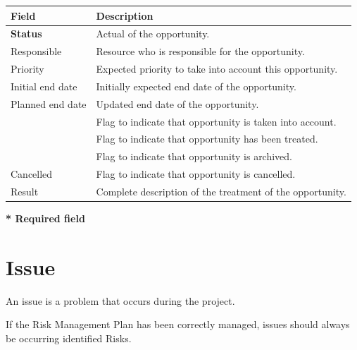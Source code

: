 \documentclass[letterpaper,10pt,english]{sphinxmanual}
\begin{document}
\begin{tabulary}{\linewidth}{|l|l|}
\hline
\textsf{\relax 
Field
} & \textsf{\relax 
Description
}\\
\hline
\textbf{Status}
 & 
Actual {\hyperref[Glossary:term-status]{\emph{}}} of the opportunity.
\\
\hline
Responsible
 & 
Resource who is responsible for the opportunity.
\\
\hline
Priority
 & 
Expected priority to take into account this opportunity.
\\
\hline
Initial end date
 & 
Initially expected end date of the opportunity.
\\
\hline
Planned end date
 & 
Updated end date of the opportunity.
\\
\hline
{\hyperref[Glossary:term-handled]{\emph{}}}
 & 
Flag to indicate that opportunity is taken into account.
\\
\hline
{\hyperref[Glossary:term-done]{\emph{}}}
 & 
Flag to indicate that opportunity has been treated.
\\
\hline
{\hyperref[Glossary:term-closed]{\emph{}}}
 & 
Flag to indicate that opportunity is archived.
\\
\hline
Cancelled
 & 
Flag to indicate that opportunity is cancelled.
\\
\hline
Result
 & 
Complete description of the treatment of the opportunity.
\\
\hline\end{tabulary}


\textbf{* Required field}
\newpage
{}

\section{Issue}
\label{RiskIssueManagement:issue}\label{RiskIssueManagement:index-2}
An issue is a problem that occurs during the project.

If the Risk Management Plan has been correctly managed, issues should always be occurring identified Risks.
\end{document}
